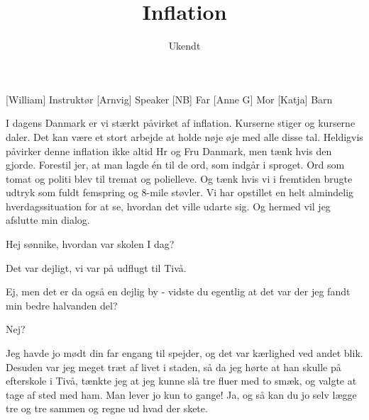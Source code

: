 \documentclass[a4paper,11pt]{article}
\title{Inflation}
\author{Ukendt}
\begin{document}
\maketitle

\begin{roles}
[William] Instruktør
[Arnvig] Speaker
[NB] Far
[Anne G] Mor
[Katja] Barn
\end{roles}


\begin{sketch}


 I dagens Danmark er vi stærkt påvirket af inflation. Kurserne stiger og kurserne daler. Det kan være et stort arbejde at holde nøje øje med alle disse tal. Heldigvis påvirker denne inflation ikke altid Hr og Fru Danmark, men tænk hvis den gjorde. Forestil jer, at man lagde én til de ord, som indgår i sproget. Ord som tomat og politi blev til tremat og polielleve. Og tænk hvis vi i fremtiden brugte udtryk som fuldt femspring og 8-mile støvler. Vi har opstillet en helt almindelig hverdagssituation for at se, hvordan det ville udarte sig. Og hermed vil jeg afslutte min dialog.


 Hej sønnike, hvordan var skolen I dag?

 Det var dejligt, vi var på udflugt til Tivå.

 Ej, men det er da også en dejlig by - vidste du egentlig at det var der jeg fandt min bedre halvanden del?

 Nej?

 Jeg havde jo mødt din far engang til spejder, og det var kærlighed ved andet blik. Desuden var jeg meget træt af livet i staden, så da jeg hørte at han skulle på efterskole i Tivå, tænkte jeg at jeg kunne slå tre fluer med to smæk, og valgte at tage af sted med ham. Man lever jo kun to gange! Ja, og så kan du jo selv lægge tre og tre sammen og regne ud hvad der skete.


\end{sketch}
\end{document}
